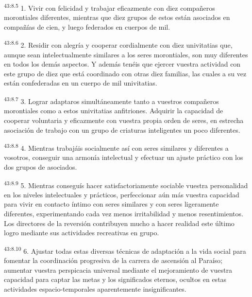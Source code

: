 \par
\textsuperscript{43:8.5} 1. Vivir con felicidad y trabajar eficazmente con diez compañeros morontiales diferentes, mientras que diez grupos de estos están asociados en compañías de cien, y luego federados en cuerpos de mil.

\par
\textsuperscript{43:8.6} 2. Residir con alegría y cooperar cordialmente con diez univitatias que, aunque sean intelectualmente similares a los seres morontiales, son muy diferentes en todos los demás aspectos. Y además tenéis que ejercer vuestra actividad con este grupo de diez que está coordinado con otras diez familias, las cuales a su vez están confederadas en un cuerpo de mil univitatias.

\par
\textsuperscript{43:8.7} 3. Lograr adaptaros simultáneamente tanto a vuestros compañeros morontiales como a estos univitatias anfitriones. Adquirir la capacidad de cooperar voluntaria y eficazmente con vuestra propia orden de seres, en estrecha asociación de trabajo con un grupo de criaturas inteligentes un poco diferentes.

\par
\textsuperscript{43:8.8} 4. Mientras trabajáis socialmente así con seres similares y diferentes a vosotros, conseguir una armonía intelectual y efectuar un ajuste práctico con los dos grupos de asociados.

\par
\textsuperscript{43:8.9} 5. Mientras conseguís hacer satisfactoriamente sociable vuestra personalidad en los niveles intelectuales y prácticos, perfeccionar aún más vuestra capacidad para vivir en contacto íntimo con seres similares y con seres ligeramente diferentes, experimentando cada vez menos irritabilidad y menos resentimientos. Los directores de la reversión contribuyen mucho a hacer realidad este último logro mediante sus actividades recreativas en grupo.

\par
\textsuperscript{43:8.10} 6. Ajustar todas estas diversas técnicas de adaptación a la vida social para fomentar la coordinación progresiva de la carrera de ascensión al Paraíso; aumentar vuestra perspicacia universal mediante el mejoramiento de vuestra capacidad para captar las metas y los significados eternos, ocultos en estas actividades espacio-temporales aparentemente insignificantes.

